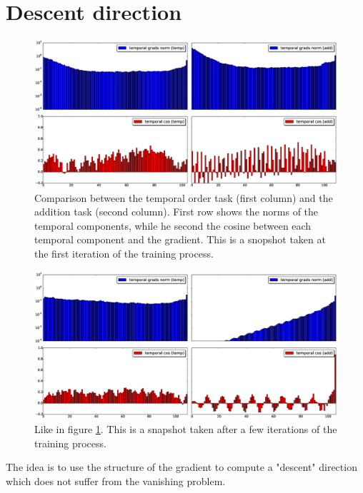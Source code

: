 \section{Descent direction}

\begin{figure}
	\includegraphics[width=1\textwidth]{chapter3/compare_add_temp_norms_0.eps}
	\caption{Comparison between the temporal order task (first column) and the addition task (second column). First row shows the norms of the temporal components, while he second the cosine between each temporal component and the gradient. This is a snopshot taken at the first iteration of the training process.}
	\label{fig:comparison_add_temp_0}
\end{figure}

\begin{figure}
	\includegraphics[width=1\textwidth]{chapter3/compare_add_temp_norms_1.eps}
	\caption{Like in figure \ref{fig:comparison_add_temp_0}. This is a snapshot taken after a few iterations of the training process.}
	\label{fig:comparison_add_temp_1}
\end{figure}


The idea is to use the structure of the gradient to compute a "descent" direction which does not suffer from the vanishing problem.

